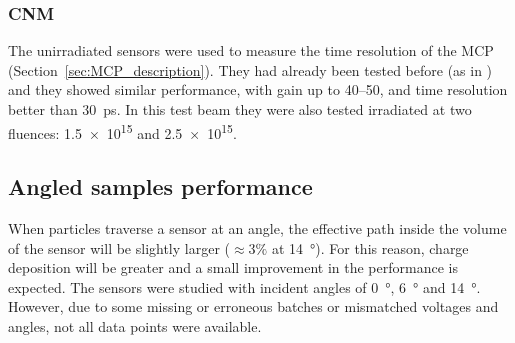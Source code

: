 \subsubsection{CNM}

The unirradiated sensors were used to measure the time resolution of the MCP (Section~\ref{sec:MCP_description}). They had already been tested before (as in \cite{Allaire:2018bof}) and they showed similar performance, with gain up to \qtyrange{40}{50}{}, and time resolution better than \qty{30}{\pico\second}. In this test beam they were also tested irradiated at two fluences: \qty{1.5e15}{\neutroneq} and \qty{2.5e15}{\neutroneq}.

\begin{figure}[h!tbp]
    \centering
    \hfill
    \vfill
    \begin{minipage}[c]{.47\linewidth}
    \end{minipage}
    \hfill
    \begin{minipage}[c]{.5\linewidth}
\end{minipage}
\end{figure}

\FloatBarrier 

\subsection{Angled samples performance}

When particles traverse a sensor at an angle, the effective path inside the volume of the sensor will be slightly larger (\(\approx3\%\) at \qty{14}{\degree}). For this reason, charge deposition will be greater and a small improvement in the performance is expected.
The sensors were studied with incident angles of \qty{0}{\degree}, \qty{6}{\degree} and \qty{14}{\degree}. However, due to some missing or erroneous batches or mismatched voltages and angles, not all data points were available.

